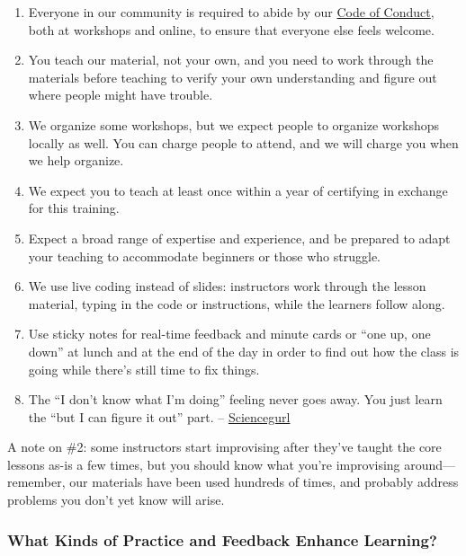 \begin{enumerate}
\def\labelenumi{\arabic{enumi}.}
\itemsep1pt\parskip0pt
\item
  Everyone in our community is required to abide by our
  \href{\{\{\%20site.swc\_site\%20\}\}/conduct/}{Code of Conduct}, both
  at workshops and online, to ensure that everyone else feels welcome.
\item
  You teach our material, not your own, and you need to work through the
  materials before teaching to verify your own understanding and figure
  out where people might have trouble.
\item
  We organize some workshops, but we expect people to organize workshops
  locally as well. You can charge people to attend, and we will charge
  you when we help organize.
\item
  We expect you to teach at least once within a year of certifying in
  exchange for this training.
\item
  Expect a broad range of expertise and experience, and be prepared to
  adapt your teaching to accommodate beginners or those who struggle.
\item
  We use live coding instead of slides: instructors work through the
  lesson material, typing in the code or instructions, while the
  learners follow along.
\item
  Use sticky notes for real-time feedback and minute cards or ``one up,
  one down'' at lunch and at the end of the day in order to find out how
  the class is going while there's still time to fix things.
\item
  The ``I don't know what I'm doing'' feeling never goes away. You just
  learn the ``but I can figure it out'' part. --
  \href{https://twitter.com/sciencegurlz0/status/687739023826235393}{Sciencegurl}
\end{enumerate}

A note on \#2: some instructors start improvising after they've taught
the core lessons as-is a few times, but you should know what you're
improvising around---remember, our materials have been used hundreds of
times, and probably address problems you don't yet know will arise.

\subsubsection{What Kinds of Practice and Feedback Enhance
Learning?}\label{what-kinds-of-practice-and-feedback-enhance-learning}

